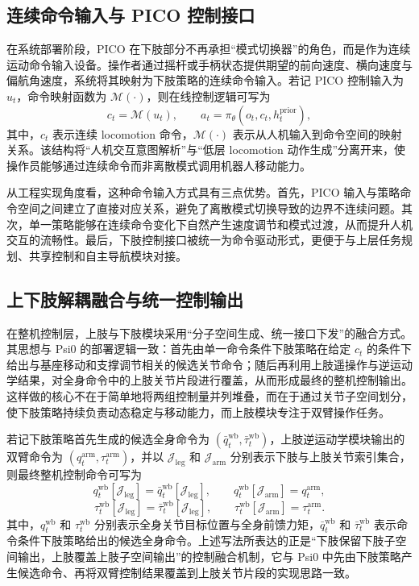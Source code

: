 \subsection{连续命令输入与 PICO 控制接口}

在系统部署阶段，PICO 在下肢部分不再承担“模式切换器”的角色，而是作为连续运动命令输入设备。操作者通过摇杆或手柄状态提供期望的前向速度、横向速度与偏航角速度，系统将其映射为下肢策略的连续命令输入。若记 PICO 控制输入为 $u_t$，命令映射函数为 $\mathcal{M}(\cdot)$，则在线控制逻辑可写为
\begin{equation}
c_t = \mathcal{M}(u_t), \qquad a_t = \pi_{\theta}(o_t, c_t, h_t^{\mathrm{prior}}),
\end{equation}
其中，$c_t$ 表示连续 locomotion 命令，$\mathcal{M}(\cdot)$ 表示从人机输入到命令空间的映射关系。该结构将“人机交互意图解析”与“低层 locomotion 动作生成”分离开来，使操作员能够通过连续命令而非离散模式调用机器人移动能力。

从工程实现角度看，这种命令输入方式具有三点优势。首先，PICO 输入与策略命令空间之间建立了直接对应关系，避免了离散模式切换导致的边界不连续问题。其次，单一策略能够在连续命令变化下自然产生速度调节和模式过渡，从而提升人机交互的流畅性。最后，下肢控制接口被统一为命令驱动形式，更便于与上层任务规划、共享控制和自主导航模块对接。

\subsection{上下肢解耦融合与统一控制输出}

在整机控制层，上肢与下肢模块采用“分子空间生成、统一接口下发”的融合方式。其思想与 Psi0 的部署逻辑一致：首先由单一命令条件下肢策略在给定 $c_t$ 的条件下给出与基座移动和支撑调节相关的候选关节命令；随后再利用上肢遥操作与逆运动学结果，对全身命令中的上肢关节片段进行覆盖，从而形成最终的整机控制输出。这样做的核心不在于简单地将两组控制量并列堆叠，而在于通过关节子空间划分，使下肢策略持续负责动态稳定与移动能力，而上肢模块专注于双臂操作任务。

若记下肢策略首先生成的候选全身命令为 $(\bar{q}_t^{\mathrm{wb}}, \bar{\tau}_t^{\mathrm{wb}})$，上肢逆运动学模块输出的双臂命令为 $(q_t^{\mathrm{arm}}, \tau_t^{\mathrm{arm}})$，并以 $\mathcal{J}_{\mathrm{leg}}$ 和 $\mathcal{J}_{\mathrm{arm}}$ 分别表示下肢与上肢关节索引集合，则最终整机控制命令可写为
\begin{equation}
q_t^{\mathrm{wb}}[\mathcal{J}_{\mathrm{leg}}] = \bar{q}_t^{\mathrm{wb}}[\mathcal{J}_{\mathrm{leg}}], \qquad
q_t^{\mathrm{wb}}[\mathcal{J}_{\mathrm{arm}}] = q_t^{\mathrm{arm}},
\end{equation}
\begin{equation}
\tau_t^{\mathrm{wb}}[\mathcal{J}_{\mathrm{leg}}] = \bar{\tau}_t^{\mathrm{wb}}[\mathcal{J}_{\mathrm{leg}}], \qquad
\tau_t^{\mathrm{wb}}[\mathcal{J}_{\mathrm{arm}}] = \tau_t^{\mathrm{arm}}.
\end{equation}
其中，$q_t^{\mathrm{wb}}$ 和 $\tau_t^{\mathrm{wb}}$ 分别表示全身关节目标位置与全身前馈力矩，$\bar{q}_t^{\mathrm{wb}}$ 和 $\bar{\tau}_t^{\mathrm{wb}}$ 表示命令条件下肢策略给出的候选全身命令。上述写法所表达的正是“下肢保留下肢子空间输出，上肢覆盖上肢子空间输出”的控制融合机制，它与 Psi0 中先由下肢策略产生候选命令、再将双臂控制结果覆盖到上肢关节片段的实现思路一致。

